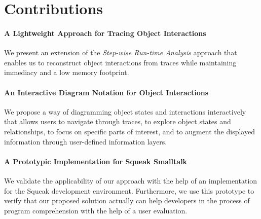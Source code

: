 \section{Contributions}
\label{s:contributions}

\paragraph{A Lightweight Approach for Tracing Object Interactions} We present an extension of the \emph{Step-wise Run-time Analysis} approach that enables us to reconstruct object interactions from traces while maintaining immediacy and a low memory footprint.

\paragraph{An Interactive Diagram Notation for Object Interactions} We propose a way of diagramming object states and interactions interactively that allows users to navigate through traces, to explore object states and relationships, to focus on specific parts of interest, and to augment the displayed information through user-defined information layers.

\paragraph{A Prototypic Implementation for Squeak Smalltalk} We validate the applicability of our approach with the help of an implementation for the Squeak development environment.
Furthermore, we use this prototype to verify that our proposed solution actually can help developers in the process of program comprehension with the help of a user evaluation.


